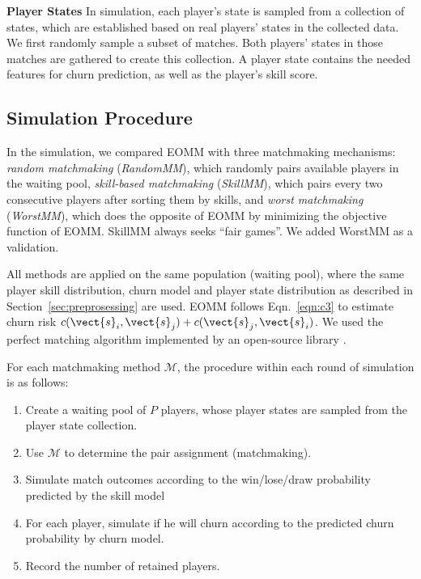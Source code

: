 \textbf{Player States} In simulation, each player's state is sampled from a collection of states, which are established based on real players' states in the collected data. We first randomly sample a subset of matches. Both players' states in those matches are gathered to create this collection. A player state contains the needed features for churn prediction, as well as the player's skill score.


\subsection{Simulation Procedure}
In the simulation, we compared EOMM with three matchmaking mechanisms: \textit{random matchmaking} (\textit{RandomMM}), which randomly pairs available players in the waiting pool, \textit{skill-based matchmaking} (\textit{SkillMM}), which pairs every two consecutive players after sorting them by skills, and \textit{worst matchmaking} (\textit{WorstMM}), which does the opposite of EOMM by minimizing the objective function of EOMM. SkillMM always seeks ``fair games''. We added WorstMM as a validation.

All methods are applied on the same population (waiting pool), where the same player skill distribution, churn model and player state distribution as described in Section~\ref{sec:preprosessing} are used. EOMM follows Eqn.~\ref{eqn:c3} to estimate churn risk $c(\vect{s}_i, \vect{s}_j) + c(\vect{s}_j, \vect{s}_i)$. We used the perfect matching algorithm \cite{gabow1974implementation,lawler2001combinatorial} implemented by an open-source library \cite{onlineperfectmatching}.



For each matchmaking method $\mathcal{M}$, the procedure within each round of simulation is as follows:
\begin{enumerate}
\item Create a waiting pool of $P$ players, whose player states are sampled from the player state collection.
\item Use $\mathcal{M}$ to determine the pair assignment (matchmaking).
\item Simulate match outcomes according to the win/lose/draw probability predicted by the skill model
\item For each player, simulate if he will churn according to the predicted churn probability by churn model.
\item Record the number of retained players.
\end{enumerate}

